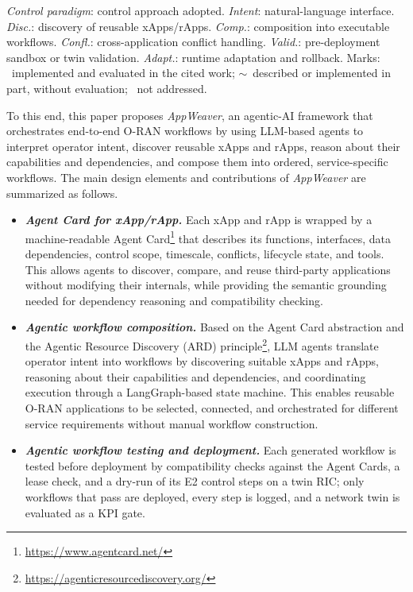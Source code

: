 \documentclass[conference]{IEEEtran}
\begin{document}
\begin{table}[t]
\begin{tabular}{@{}llccccccl@{}}
\bottomrule
\end{tabular}
\begin{minipage}{\textwidth}
\vspace{2pt}
\footnotesize
\emph{Control paradigm}: control approach adopted. \emph{Intent}: natural-language interface. \emph{Disc.}: discovery of reusable xApps/rApps. \emph{Comp.}: composition into executable workflows. \emph{Confl.}: cross-application conflict handling. \emph{Valid.}: pre-deployment sandbox or twin validation. \emph{Adapt.}: runtime adaptation and rollback. Marks: ~implemented and evaluated in the cited work; $\sim$~described or implemented in part, without evaluation; ~not addressed.
\end{minipage}
\end{table}



To this end, this paper proposes \emph{AppWeaver}, an agentic-AI framework that orchestrates end-to-end O-RAN workflows by using LLM-based agents to interpret operator intent, discover reusable xApps and rApps, reason about their capabilities and dependencies, and compose them into ordered, service-specific workflows. The main design elements and contributions of \emph{AppWeaver} are summarized as follows.
\begin{itemize}
    \item \textbf{\textit{Agent Card for xApp/rApp.}}     Each xApp and rApp is wrapped by a machine-readable Agent Card\footnote{\url{https://www.agentcard.net/}} that describes its functions, interfaces, data dependencies, control scope, timescale, conflicts, lifecycle state, and tools. This allows agents to discover, compare, and reuse third-party applications without modifying their internals, while providing the semantic grounding needed for dependency reasoning and compatibility checking. 
    \item \textbf{\textit{Agentic workflow composition.}}   Based on the Agent Card abstraction and the Agentic Resource Discovery (ARD) principle\footnote{\url{https://agenticresourcediscovery.org/}}, LLM agents translate operator intent into workflows by discovering suitable xApps and rApps, reasoning about their capabilities and dependencies, and coordinating execution through a LangGraph-based state machine. This enables reusable O-RAN applications to be selected, connected, and orchestrated for different service requirements without manual workflow construction.
    \item \textbf{\textit{Agentic workflow testing and deployment.}}  Each generated workflow is tested before deployment by compatibility checks against the Agent Cards, a lease check, and a dry-run of its E2 control steps on a twin RIC; only workflows that pass are deployed, every step is logged, and a network twin is evaluated as a KPI gate.
\end{itemize}
\end{document}
